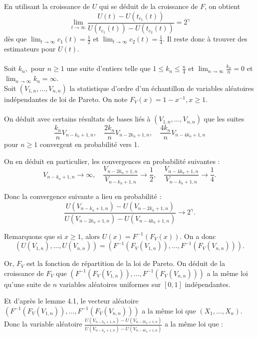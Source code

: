 \documentclass{article}
\theoremstyle{plain}
\theoremstyle{definition}
\theoremstyle{plain}
\begin{document}
\noindent En utilisant la croissance de $U$ qui se déduit de la croissance de $F$, on obtient
\[
\lim_{t \to \infty} \frac{U(t) - U(t_{c_1}(t))}{U(t_{c_1}(t)) - U(t_{c_2}(t))} = 2^{\gamma}
\]
dès que $\lim_{t \to \infty} c_1(t) = \frac{1}{2}$ et $\lim_{t \to \infty} c_2(t) = \frac{1}{4}$. Il reste donc à trouver des estimateurs pour $U(t)$.
\\
\\
Soit $k_n,$ pour $ n \geq 1$ une suite d’entiers telle que $1 \leq k_n \leq \frac{n}{4}$ et $\lim_{n \to \infty} \frac{k_n}{n} = 0$ et $\lim_{n \to \infty} k_n = \infty$.
\\
Soit $(V_{1,n},\dots,V_{n,n})$ la statistique d’ordre d’un échantillon de variables aléatoires indépendantes de loi de Pareto. On note $F_V(x) = 1 - x^{-1}, x \geq 1$.
\\
\\
\noindent On déduit avec certains résultats de bases liés à $(V_{1,n},\dots,V_{n,n})$ que les suites
\[
\frac{k_n}{n} V_{n-k_n+1,n}, \quad \frac{2k_n}{n} V_{n-2k_n+1,n}, \quad \frac{4k_n}{n} V_{n-4k_n+1,n}
\]
pour \(n \geq 1\) convergent en probabilité vers 1.

\noindent On en déduit en particulier, les convergences en probabilité suivantes :
\[
V_{n-k_n+1,n}  \to \infty, \quad \frac{V_{n-2k_n+1,n}}{V_{n-k_n+1,n}} \to \frac{1}{2}, \quad \frac{V_{n-4k_n+1,n}}{V_{n-k_n+1,n}} \to \frac{1}{4}.
\]

\noindent Donc la convergence suivante a lieu en probabilité :
\[
\frac{U(V_{n-k_n+1,n}) - U(V_{n-2k_n+1,n})}{U(V_{n-2k_n+1,n}) - U(V_{n-4k_n+1,n})} \to 2^{\gamma}.
\]

\noindent Remarquons que si $x \geq 1$, alors $U(x) = F^{-1}(F_V(x))$. On a donc
\[
(U(V_{1,n}), \dots, U(V_{n,n})) = (F^{-1}(F_V(V_{1,n})), \dots, F^{-1}(F_V(V_{n,n}))).
\]

\noindent Or, \(F_V\) est la fonction de répartition de la loi de Pareto. \newline
On déduit de la croissance de $F_V$ que $(F^{-1}(F_V(V_{1,n})),\dots, F^{-1}(F_V(V_{n,n})))$ a la même loi qu’une suite de $n$ variables aléatoires uniformes sur $[0,1]$ indépendantes. 

\noindent Et d'après le lemme 4.1, le vecteur aléatoire $(F^{-1}(F_V(V_{1,n})),\dots, F^{-1}(F_V(V_{n,n})))$ a la même loi que $(X_1,\dots,X_n)$. \\

\noindent Donc la variable aléatoire \(\frac{U(V_{n-k_n+1,n}) - U(V_{n-2k_n+1,n})}{U(V_{n-k_n+1,n}) - U(V_{n-4k_n+1,n})}\) a la même loi que :
\end{document}
